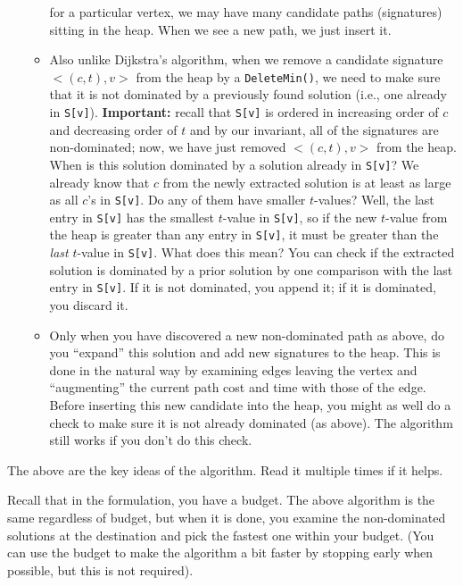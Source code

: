 \begin{itemize}
\begin{itemize}
		for a particular vertex, we may have many candidate
		paths (signatures) sitting in the heap.  When we 
		see a new path, we just insert it.
	\item Also unlike Dijkstra's algorithm, when we remove
		a candidate signature $<(c,t),v>$ from the heap
		by a \verb+DeleteMin()+, we need to make sure
		that it is not dominated by a previously found
		solution (i.e., one already in \verb+S[v]+).
		{\bf Important:}  recall that \verb+S[v]+
		is ordered in increasing order of $c$ and
		decreasing order of $t$ and by our invariant,
		all of the signatures are non-dominated; now,
		we have just removed $<(c,t),v>$ from the heap.
		When is this solution dominated by a solution
		already in \verb+S[v]+?  We already know that
		$c$ from the newly extracted solution is at
		least as large as all $c$'s in \verb+S[v]+.
		Do any of them have smaller $t$-values?  Well,
		the last entry in \verb+S[v]+ has the smallest
		$t$-value in \verb+S[v]+, so if the new $t$-value
		from the  heap is greater than any entry in 
		\verb+S[v]+, it must be greater than the {\em last}
                $t$-value in \verb+S[v]+.  What does this mean?
                You can check if the extracted solution is dominated
                by a prior solution by one comparison with
                the last entry in \verb+S[v]+.  If it is not dominated,
		you append it; if it is dominated, you discard it.
	\item Only when you have discovered a new non-dominated
		path as above, do you ``expand'' this solution and
		add new signatures to the heap.  This is done
		in the natural way by examining edges leaving the
		vertex and ``augmenting'' the current path
		cost and time with those of the edge.  
		Before inserting this new candidate into the heap,
		you might as well do a check to make sure it
		is not already dominated (as above).  The algorithm
		still works if you don't do this check.	
	\end{itemize}
\end{itemize}

The above are the key ideas of the algorithm.  Read it multiple
times if it helps.

Recall that in the formulation, you have a budget.  The above
algorithm is the same regardless of budget, but when it is done,
you examine the non-dominated solutions at the destination and
pick the fastest one within your budget.  (You can use the budget
to make the algorithm a bit faster by stopping early when
possible, but this is not required).

